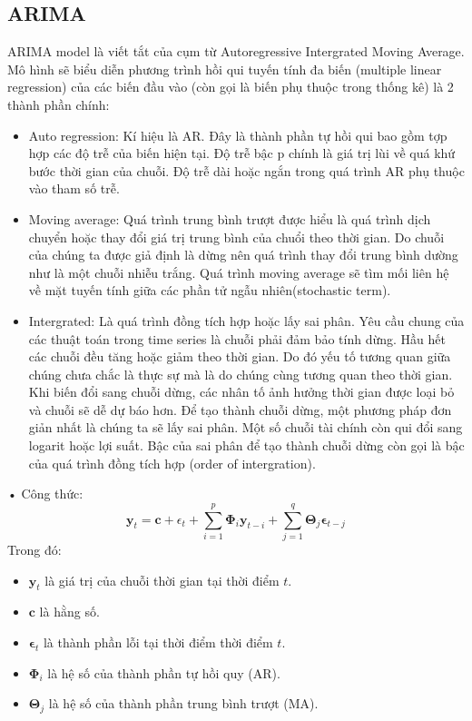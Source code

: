 \documentclass{article}
\begin{document}
\begin{multicols}{2}
    \subsection{ARIMA}
    ARIMA model là viết tắt của cụm từ Autoregressive 
    Intergrated Moving Average. Mô hình sẽ biểu diễn phương trình hồi qui tuyến tính đa biến (multiple linear regression) của các biến đầu vào (còn gọi là biến phụ thuộc trong thống kê) là 2 thành phần chính:\\
    \begin{itemize}
        \item Auto regression: Kí hiệu là AR. Đây là thành phần tự hồi qui bao gồm tợp hợp các độ trễ của biến hiện tại. Độ trễ bậc p chính là giá trị lùi về quá khứ  bước thời gian của chuỗi. Độ trễ dài hoặc ngắn trong quá trình AR phụ thuộc vào tham số trễ.
    \end{itemize}
    \begin{itemize}
        \item Moving average: Quá trình trung bình trượt được hiểu là quá trình dịch chuyển hoặc thay đổi giá trị trung bình của chuổi theo thời gian. Do chuỗi của chúng ta được giả định là dừng nên quá trình thay đổi trung bình dường như là một chuỗi nhiễu trắng. Quá trình moving average sẽ tìm mối liên hệ về mặt tuyến tính giữa các phần tử ngẫu nhiên(stochastic term). 
    \end{itemize}
    \begin{itemize}
        \item Intergrated: Là quá trình đồng tích hợp hoặc lấy sai phân. Yêu cầu chung của các thuật toán trong time series là chuỗi phải đảm bảo tính dừng. Hầu hết các chuỗi đều tăng hoặc giảm theo thời gian. Do đó yếu tố tương quan giữa chúng chưa chắc là thực sự mà là do chúng cùng tương quan theo thời gian. Khi biến đổi sang chuỗi dừng, các nhân tố ảnh hưởng thời gian được loại bỏ và chuỗi sẽ dễ dự báo hơn. Để tạo thành chuỗi dừng, một phương pháp đơn giản nhất là chúng ta sẽ lấy sai phân. Một số chuỗi tài chính còn qui đổi sang logarit hoặc lợi suất. Bậc của sai phân để tạo thành chuỗi dừng còn gọi là bậc của quá trình đồng tích hợp (order of intergration).
    \end{itemize}
     • Công thức:
       \begin{equation}
           \mathbf{y}_t = \mathbf{c} + {\epsilon}_t + \sum_{i=1}^{p} \mathbf{\Phi}_i \mathbf{y}_{t-i} + \sum_{j=1}^{q} \mathbf{\Theta}_j \boldsymbol{\epsilon}_{t-j} 
       \end{equation}  
   Trong đó:  
       \begin{itemize}
         \item \( \mathbf{y}_t \) là giá trị của chuỗi thời gian tại thời điểm \( t \).
         \item \( \mathbf{c} \) là hằng số.
         \item \( \boldsymbol{\epsilon}_t \) là thành phần lỗi tại thời điểm thời điểm \( t \).
         \item \( \mathbf{\Phi}_i \) là hệ số của thành phần tự hồi quy (AR).
         \item \( \mathbf{\Theta}_j \) là hệ số của thành phần trung bình trượt (MA).
       \end{itemize} 


\end{multicols}
\end{document}
